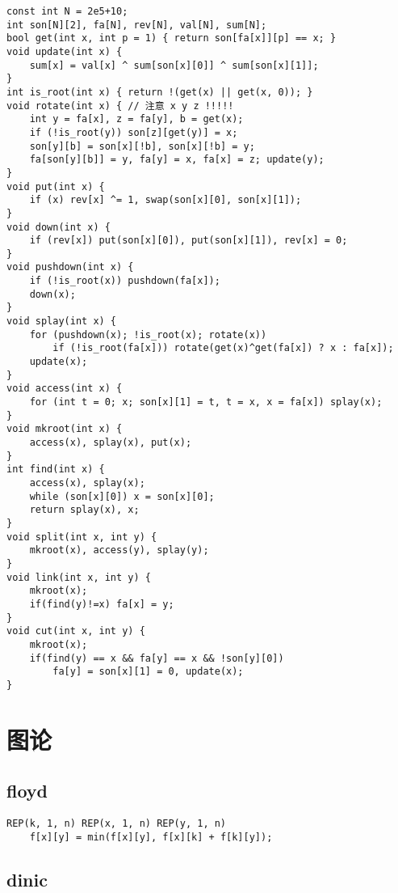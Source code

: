 \documentclass[a4paper,landscape,twocolumn]{ctexart}
\begin{document}
\begin{lstlisting}
const int N = 2e5+10;
int son[N][2], fa[N], rev[N], val[N], sum[N];
bool get(int x, int p = 1) { return son[fa[x]][p] == x; }
void update(int x) {
	sum[x] = val[x] ^ sum[son[x][0]] ^ sum[son[x][1]];
}
int is_root(int x) { return !(get(x) || get(x, 0)); }
void rotate(int x) { // 注意 x y z !!!!!
	int y = fa[x], z = fa[y], b = get(x);
	if (!is_root(y)) son[z][get(y)] = x;
	son[y][b] = son[x][!b], son[x][!b] = y;
	fa[son[y][b]] = y, fa[y] = x, fa[x] = z; update(y);
}
void put(int x) {
	if (x) rev[x] ^= 1, swap(son[x][0], son[x][1]);
}
void down(int x) {
	if (rev[x]) put(son[x][0]), put(son[x][1]), rev[x] = 0;
}
void pushdown(int x) {
	if (!is_root(x)) pushdown(fa[x]);
	down(x);
}
void splay(int x) {
	for (pushdown(x); !is_root(x); rotate(x))
		if (!is_root(fa[x])) rotate(get(x)^get(fa[x]) ? x : fa[x]);
	update(x);
}
void access(int x) {
	for (int t = 0; x; son[x][1] = t, t = x, x = fa[x]) splay(x);
}
void mkroot(int x) {
	access(x), splay(x), put(x);
}
int find(int x) {
	access(x), splay(x);
	while (son[x][0]) x = son[x][0];
	return splay(x), x;
}
void split(int x, int y) {
	mkroot(x), access(y), splay(y);
}
void link(int x, int y) {
	mkroot(x);
	if(find(y)!=x) fa[x] = y;
}
void cut(int x, int y) {
	mkroot(x);
	if(find(y) == x && fa[y] == x && !son[y][0])
		fa[y] = son[x][1] = 0, update(x);
}
\end{lstlisting}

\section{图论}

\subsection{floyd}

\begin{lstlisting}
REP(k, 1, n) REP(x, 1, n) REP(y, 1, n)
	f[x][y] = min(f[x][y], f[x][k] + f[k][y]);
\end{lstlisting}

\subsection{dinic}
\end{document}
